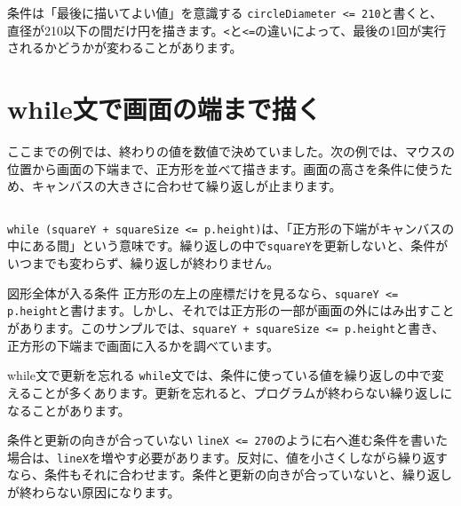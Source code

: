 \begin{notebox}{条件は「最後に描いてよい値」を意識する}
\texttt{circleDiameter <= 210}と書くと、直径が210以下の間だけ円を描きます。\texttt{<}と\texttt{<=}の違いによって、最後の1回が実行されるかどうかが変わることがあります。
\end{notebox}

\section{while文で画面の端まで描く}

ここまでの例では、終わりの値を数値で決めていました。次の例では、マウスの位置から画面の下端まで、正方形を並べて描きます。画面の高さを条件に使うため、キャンバスの大きさに合わせて繰り返しが止まります。

\begin{listing}[htbp]
\inputminted{ts}{typescript-p5/listings/chapter07/while-stacked-squares.ts}
\caption{while文で画面の下まで正方形を並べる（\texttt{chapter07/while-stacked-squares.ts}）}
\label{lst:chapter07-while-stacked-squares}
\end{listing}

\texttt{while (squareY + squareSize <= p.height)}は、「正方形の下端がキャンバスの中にある間」という意味です。繰り返しの中で\texttt{squareY}を更新しないと、条件がいつまでも変わらず、繰り返しが終わりません。

\begin{pointbox}{図形全体が入る条件}
正方形の左上の座標だけを見るなら、\texttt{squareY <= p.height}と書けます。しかし、それでは正方形の一部が画面の外にはみ出すことがあります。このサンプルでは、\texttt{squareY + squareSize <= p.height}と書き、正方形の下端まで画面に入るかを調べています。
\end{pointbox}

\begin{mistakebox}{while文で更新を忘れる}
\texttt{while}文では、条件に使っている値を繰り返しの中で変えることが多くあります。更新を忘れると、プログラムが終わらない繰り返しになることがあります。
\end{mistakebox}

\begin{mistakebox}{条件と更新の向きが合っていない}
\texttt{lineX <= 270}のように右へ進む条件を書いた場合は、\texttt{lineX}を増やす必要があります。反対に、値を小さくしながら繰り返すなら、条件もそれに合わせます。条件と更新の向きが合っていないと、繰り返しが終わらない原因になります。
\end{mistakebox}

